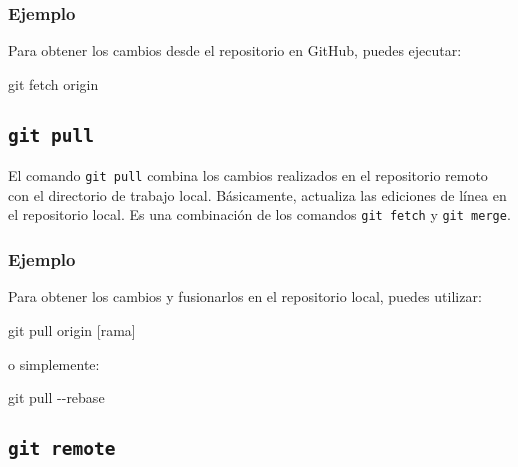 \documentclass[
  a4paper,
]{article}
\newenvironment{Shaded}{}{}
\newcommand{\AttributeTok}[1]{\textcolor[rgb]{0.84,0.23,0.29}{#1}}
\newcommand{\FunctionTok}[1]{\textcolor[rgb]{0.44,0.26,0.76}{#1}}
\newcommand{\NormalTok}[1]{\textcolor[rgb]{0.14,0.16,0.18}{#1}}
\newcommand{\PreprocessorTok}[1]{\textcolor[rgb]{0.84,0.23,0.29}{#1}}
\newcommand{\SpecialStringTok}[1]{\textcolor[rgb]{0.01,0.18,0.38}{#1}}
\begin{document}
\subsubsection{Ejemplo}\label{ejemplo}

Para obtener los cambios desde el repositorio en GitHub, puedes
ejecutar:

\begin{Shaded}
\begin{Highlighting}[]
\FunctionTok{git}\NormalTok{ fetch origin}
\end{Highlighting}
\end{Shaded}

\subsection{\texorpdfstring{\texttt{git\ pull}}{git pull}}\label{git-pull}

El comando \texttt{git\ pull} combina los cambios realizados en el
repositorio remoto con el directorio de trabajo local. Básicamente,
actualiza las ediciones de línea en el repositorio local. Es una
combinación de los comandos \texttt{git\ fetch} y \texttt{git\ merge}.

\subsubsection{Ejemplo}\label{ejemplo-1}

Para obtener los cambios y fusionarlos en el repositorio local, puedes
utilizar:

\begin{Shaded}
\begin{Highlighting}[]
\FunctionTok{git}\NormalTok{ pull origin }\PreprocessorTok{[}\SpecialStringTok{rama}\PreprocessorTok{]}
\end{Highlighting}
\end{Shaded}

o simplemente:

\begin{Shaded}
\begin{Highlighting}[]
\FunctionTok{git}\NormalTok{ pull }\AttributeTok{{-}{-}rebase}
\end{Highlighting}
\end{Shaded}

\subsection{\texorpdfstring{\texttt{git\ remote}}{git remote}}\label{git-remote}
\end{document}
